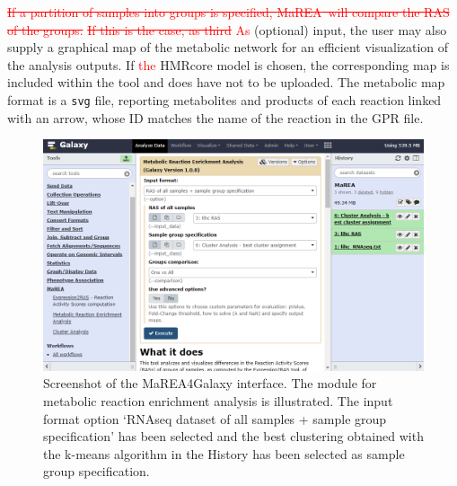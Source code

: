 \documentclass[preprint,12pt,authoryear]{elsarticle}
\newcommand{\red}{\textcolor{red}}
\newcommand{\mareagalaxy}{\textsf{MaREA4Galaxy}}
\newcommand{\mareaTool}{\textsf{MaREA}}
\begin{document}
\red{\sout{If a partition of samples into groups is specified,
    \mareaTool\ will compare the RAS of the groups.}} \red{\sout{If
    this is the case, as third} As} (optional) input, the user may
also supply a graphical map of the metabolic network for an efficient
visualization of the analysis outputs. If \red{the} \textsf{HMRcore}
model is chosen, the corresponding map is included within the tool and
does have not to be uploaded. The metabolic map format is a
\texttt{svg} file, reporting metabolites and products of each reaction
linked with an arrow, whose ID matches the name of the reaction in the
GPR file.

\begin{figure}[ht]
  \includegraphics[width=1\textwidth]{figs/screenshot3v2q.png}
  \caption{Screenshot of the \mareagalaxy{} interface. The module for
    metabolic reaction enrichment analysis is illustrated. The input
    format option `RNAseq dataset of all samples + sample group
    specification' has been selected and the best clustering obtained
    with the k-means algorithm in the History has been selected as
    sample group specification.}
  \label{fig:screenshot3}
\end{figure}
\end{document}
